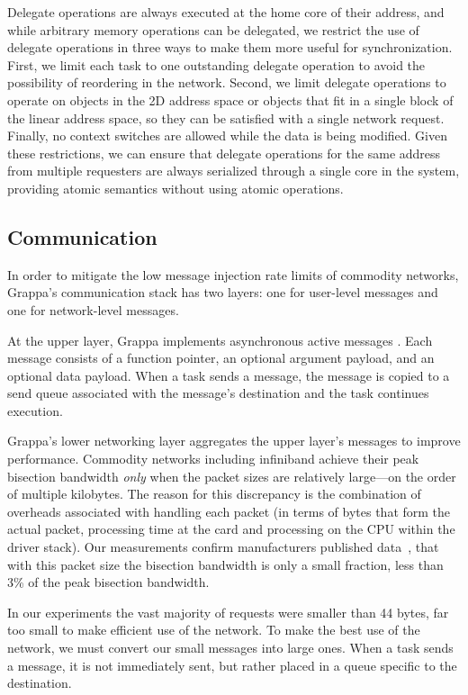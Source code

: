Delegate operations are always executed at the home core of their address, and while arbitrary memory operations can be delegated, we restrict the use of delegate operations in three ways to make them more useful for synchronization. First, we limit each task to one outstanding delegate operation to avoid the possibility of reordering in the network. Second, we limit delegate operations to operate on objects in the 2D address space or objects that fit in a single block of the linear address space, so they can be satisfied with a single network request. Finally, no context switches are allowed while the data is being modified. Given these restrictions, we can ensure that delegate operations for the same address from multiple requesters are always serialized through a single core in the system, providing atomic semantics without using atomic operations. 

\subsection{Communication}
\label{sec:communication}

In order to mitigate the low message injection rate limits of commodity networks, Grappa's communication stack has two layers: one for user-level messages and one for network-level messages.

At the upper layer, Grappa implements asynchronous active messages \cite{vonEicken92}. Each message consists of a function pointer, an optional argument payload, and an optional data payload. When a task sends a message, the message is copied to a send queue associated with the message's destination and the task continues execution.

Grappa's lower networking layer aggregates the upper layer's messages to improve performance. Commodity networks including infiniband achieve their peak bisection bandwidth \emph{only} when the packet sizes are relatively large---on the order of multiple kilobytes. The reason for this discrepancy is the combination of overheads associated with handling each packet (in terms of bytes that form the actual packet, processing time at the card and processing on the CPU within the driver stack). Our measurements confirm manufacturers published data~\cite{infinibandbandwidth}, that with this packet size the bisection bandwidth is only a small fraction, less than 3\% of the peak bisection bandwidth.

In our experiments the vast majority of requests were smaller than 44 bytes, far too small to make efficient use of the network. To make the best use of the network, we must convert our small messages into large ones. When a task sends a message, it is not immediately sent, but rather placed in a queue specific to the destination.

